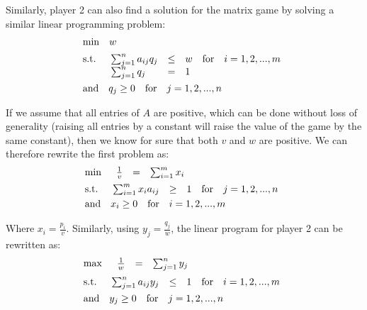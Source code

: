 \documentclass[12pt]{article}
\begin{document}
\noindent
Similarly, player 2 can also find a solution for the matrix game by solving a similar linear programming problem:
\begin{align*}
    &\mathrm{min} \quad w \\[2pt]
    &\mathrm{s.t.} \quad
    \begin{array}[t]{l c l}
    \sum_{j = 1}^n a_{ij} q_j & \leq & w \quad \mathrm{for} \quad i = 1, 2, ... , m\\
    \sum_{j = 1}^n q_j & = & 1
    \end{array}\\
    &\mathrm{and} \quad q_j \geq 0 \quad \mathrm{for} \quad j = 1, 2, ... , n
\end{align*}
 
\noindent
If we assume that all entries of $A$ are positive, which can be done without loss of generality (raising all entries by a constant will raise the value of the game by the same constant), then we know for sure that both $v$ and $w$ are positive.
We can therefore rewrite the first problem as:
\begin{align*}
    &\mathrm{min} \quad \begin{array}[t]{l c l}
    \frac{1}{v} & = & \sum_{i = 1}^m x_i
    \end{array}\\[2pt]
    &\mathrm{s.t.} \quad
    \begin{array}[t]{l c l}
    \sum_{i = 1}^m x_i a_{ij} & \geq & 1 \quad \mathrm{for} \quad j = 1, 2, ... , n
    \end{array}\\
    &\mathrm{and} \quad x_i \geq 0 \quad \mathrm{for} \quad i = 1, 2, ... , m
\end{align*}

\noindent
Where $x_i = \frac{p_i}{v}$.
Similarly, using $y_j = \frac{q_j}{w}$, the linear program for player 2 can be rewritten as:
\begin{align*}
    &\mathrm{max} \quad \begin{array}[t]{l c l}
    \frac{1}{w} & = & \sum_{j = 1}^n y_j
    \end{array}\\[2pt]
    &\mathrm{s.t.} \quad
    \begin{array}[t]{l c l}
    \sum_{j = 1}^n a_{ij} y_j & \leq & 1 \quad \mathrm{for} \quad i = 1, 2, ... , m
    \end{array}\\
    &\mathrm{and} \quad y_j \geq 0 \quad \mathrm{for} \quad j = 1, 2, ... , n
\end{align*}
\end{document}
